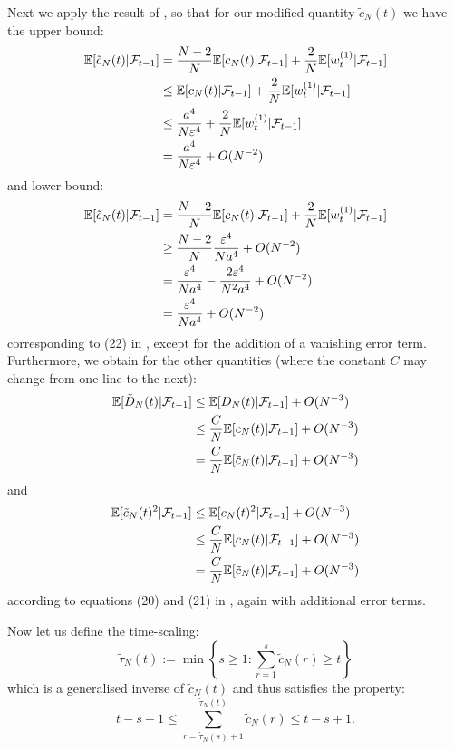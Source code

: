 \documentclass[fleqn]{article}
\theoremstyle{definition}
\newcommand{\E}{\mathbb{E}}
\newcommand{\F}{\mathcal{F}_{t-1}}
\newcommand{\wt}[2][t]{w_{#1}^{(#2)}}
\begin{document}
Next we apply the result of \citet[Lemma 3]{koskela2018}, so that for our modified quantity $\tilde{c}_N(t)$ we have the upper bound:
\begin{align}\label{eq:cN_upper}
\E[\tilde{c}_N(t) |\F] &= \frac{N-2}{N} \E[c_N(t) |\F] + \frac{2}{N} \E[\wt{1} |\F] \notag\\
& \leq \E[c_N(t) |\F] + \frac{2}{N} \E[\wt{1} |\F] \notag\\
&\leq \frac{a^4}{N\varepsilon^4} +  \frac{2}{N} \E[\wt{1} |\F] \notag\\
&= \frac{a^4}{N\varepsilon^4} + O(N^{-2})
\end{align}
and lower bound:
\begin{align}\label{eq:cN_lower}
\E[\tilde{c}_N(t) |\F] &= \frac{N-2}{N} \E[c_N(t) |\F] + \frac{2}{N} \E[\wt{1} |\F] \notag\\
& \geq  \frac{N-2}{N}\frac{\varepsilon^4}{Na^4} + O(N^{-2}) \notag\\
& = \frac{\varepsilon^4}{Na^4} - \frac{2\varepsilon^4}{N^2a^4} + O(N^{-2}) \notag\\
& = \frac{\varepsilon^4}{Na^4} + O(N^{-2})
\end{align}
corresponding to (22) in \citet{koskela2018}, except for the addition of a vanishing error term.
Furthermore, we obtain for the other quantities (where the constant $C$ may change from one line to the next):
\begin{align}\label{eq:DN_upper}
\E[\tilde{D}_N(t) |\F] &\leq \E[D_N(t) |\F] + O(N^{-3}) \notag\\
&\leq \frac{C}{N} \E[c_N(t) |\F] + O(N^{-3}) \notag\\
&= \frac{C}{N} \E[\tilde{c}_N(t) |\F] + O(N^{-3})
\end{align}
and
\begin{align}\label{eq:cN2_upper}
\E[\tilde{c}_N(t)^2 |\F] &\leq \E[c_N(t)^2 |\F] + O(N^{-3}) \notag\\
&\leq \frac{C}{N} \E[c_N(t) |\F] + O(N^{-3}) \notag\\
&= \frac{C}{N} \E[\tilde{c}_N(t) |\F] + O(N^{-3})
\end{align}
according to equations (20) and (21) in \citet{koskela2018}, again with additional error terms.

Now let us define the time-scaling:
\begin{equation*}
\tilde{\tau}_N(t) := \min\left\{ s\geq 1 : \sum_{r=1}^s \tilde{c}_N(r) \geq t \right\}
\end{equation*}
which is a generalised inverse of $\tilde{c}_N(t)$ and thus satisfies the property:
\begin{equation}\label{eq:sum_tau_cN_upperlower}
t-s-1 \leq \sum_{r=\tilde{\tau}_N(s)+1}^{\tilde{\tau}_N(t)} \tilde{c}_N(r) \leq t-s +1 .
\end{equation}
\end{document}
